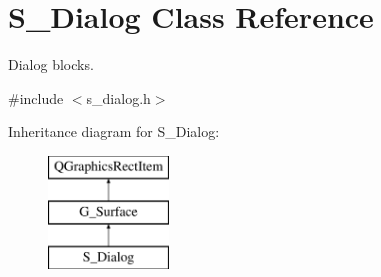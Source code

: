 \hypertarget{class_s___dialog}{}\section{S\+\_\+\+Dialog Class Reference}
\label{class_s___dialog}


Dialog blocks.  




{\ttfamily \#include $<$s\+\_\+dialog.\+h$>$}

Inheritance diagram for S\+\_\+\+Dialog\+:\begin{figure}[H]
\begin{center}
\leavevmode
\includegraphics[height=3.000000cm]{class_s___dialog}
\end{center}
\end{figure}
